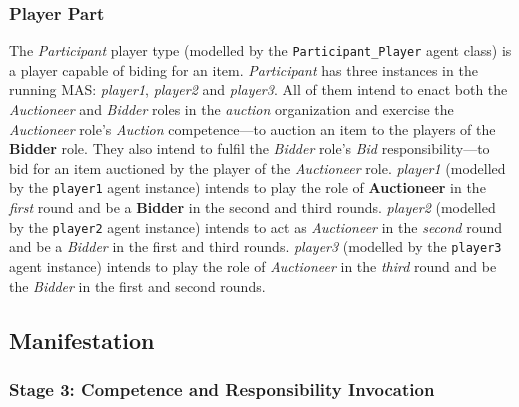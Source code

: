 \subsubsection*{Player Part}

The \textit{Participant} player type (modelled by the \texttt{Participant\_Player} agent class) is a player capable of biding for an item.
\textit{Participant} has three instances in the running MAS: \textit{player1}, \textit{player2} and \textit{player3}.
All of them intend to enact both the \textit{Auctioneer} and \textit{Bidder} roles in the \textit{auction} organization and exercise the \textit{Auctioneer} role's \textit{Auction} competence---to auction an item to the players of the \textbf{Bidder} role.
They also intend to fulfil the \textit{Bidder} role's \textit{Bid} responsibility---to bid for an item auctioned by the player of the \textit{Auctioneer} role.
\textit{player1} (modelled by the \texttt{player1} agent instance) intends to play the role of \textbf{Auctioneer} in the \textit{first} round and be a \textbf{Bidder} in the second and third rounds.
\textit{player2} (modelled by the \texttt{player2} agent instance) intends to act as \textit{Auctioneer} in the \textit{second} round and be a \textit{Bidder} in the first and third rounds.
\textit{player3} (modelled by the \texttt{player3} agent instance) intends to play the role of \textit{Auctioneer} in the \textit{third} round and be the \textit{Bidder} in the first and second rounds.

\subsection*{Manifestation} 

\subsubsection*{Stage 3: Competence and Responsibility Invocation}

